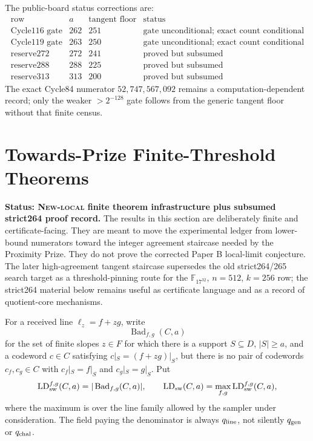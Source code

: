\documentclass[11pt]{article}
\newcommand{\F}{\mathbb F}
\newcommand{\qline}{q_{\rm line}}
\newcommand{\qgen}{q_{\rm gen}}
\newcommand{\qchal}{q_{\rm chal}}
\begin{document}
The public-board status corrections are:
\[
\begin{array}{c|c|c|c}
\text{row} & a & \text{tangent floor} & \text{status}\\
\hline
\text{Cycle116 gate} & 262 & 251 & \text{gate unconditional; exact count conditional}\\
\text{Cycle119 gate} & 263 & 250 & \text{gate unconditional; exact count conditional}\\
\text{reserve272} & 272 & 241 & \text{proved but subsumed}\\
\text{reserve288} & 288 & 225 & \text{proved but subsumed}\\
\text{reserve313} & 313 & 200 & \text{proved but subsumed}
\end{array}
\]
The exact Cycle84 numerator \(52{,}747{,}567{,}092\) remains a
computation-dependent record; only the weaker \(>2^{-128}\) gate follows from
the generic tangent floor without that finite census.







\section{Towards-Prize Finite-Threshold Theorems}
\label{sec:towards-prize-thresholds}

\textbf{Status: \textsc{New-local} finite theorem infrastructure plus
subsumed strict264 proof record.}
The results in this section are deliberately finite and certificate-facing.  They
are meant to move the experimental ledger from lower-bound numerators toward the
integer agreement staircase needed by the Proximity Prize.  They do not prove the
corrected Paper B local-limit conjecture.  The later
high-agreement tangent staircase supersedes the old strict264/265 search target
as a threshold-pinning route for the \(\F_{17^{32}}\), \(n=512\), \(k=256\)
row; the strict264 material below remains useful as certificate language and
as a record of quotient-core mechanisms.

For a received line \(\ell_z=f+zg\), write
\[
  \operatorname{Bad}_{f,g}(C,a)
\]
for the set of finite slopes \(z\in F\) for which there is a support
\(S\subseteq D\), \(|S|\ge a\), and a codeword \(c\in C\) satisfying
\(c|_S=(f+zg)|_S\), but there is no pair of codewords
\(c_f,c_g\in C\) with \(c_f|_S=f|_S\) and \(c_g|_S=g|_S\).  Put
\[
  \operatorname{LD}_{\rm sw}^{f,g}(C,a)
  =|\operatorname{Bad}_{f,g}(C,a)|,
  \qquad
  \operatorname{LD}_{\rm sw}(C,a)
  =\max_{f,g}\operatorname{LD}_{\rm sw}^{f,g}(C,a),
\]
where the maximum is over the line family allowed by the sampler under
consideration.  The field paying the denominator is always \(\qline\), not
silently \(\qgen\) or \(\qchal\).
\end{document}
